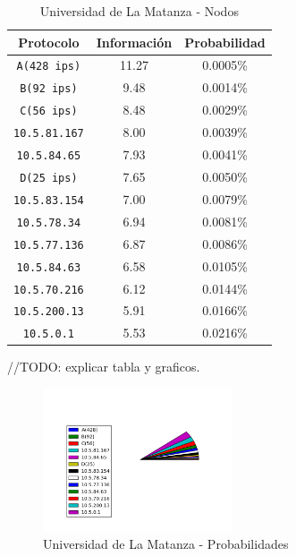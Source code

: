 \documentclass[final,inline,narroweqnarray,a4paper]{ieee}
\begin{document}
\begin{table}[H]
    \begin{center}
        \begin{tabular}{|c|c|c|}
            \hline
            \textbf{Protocolo} & \textbf{Información} & \textbf{Probabilidad} \\ \hline
            \texttt{A(428 ips)}   &11.27       & 0.0005\%     \\ \hline
            \texttt{B(92 ips)}    &9.48        & 0.0014\%     \\ \hline
            \texttt{C(56 ips)}    &8.48        & 0.0029\%     \\ \hline
	    \texttt{10.5.81.167}  &8.00        & 0.0039\%     \\ \hline
	    \texttt{10.5.84.65}   &7.93        & 0.0041\%     \\ \hline
            \texttt{D(25 ips)}    &7.65        & 0.0050\%     \\ \hline
	    \texttt{10.5.83.154}  &7.00        & 0.0079\%     \\ \hline
	    \texttt{10.5.78.34}   &6.94        & 0.0081\%     \\ \hline
	    \texttt{10.5.77.136}  &6.87        & 0.0086\%     \\ \hline
	    \texttt{10.5.84.63}   &6.58        & 0.0105\%     \\ \hline
	    \texttt{10.5.70.216}  &6.12        & 0.0144\%     \\ \hline
	    \texttt{10.5.200.13}  &5.91        & 0.0166\%     \\ \hline
	    \texttt{10.5.0.1}     &5.53        & 0.0216\%     \\ \hline
        \end{tabular}
        \caption{Universidad de La Matanza - Nodos}
        \label{table:universidadLMS1}
    \end{center}
\end{table}

//TODO: explicar tabla y graficos.

\begin{figure}[H]
    \begin{center}
        \includegraphics[width=0.5\textwidth]{plot/facultadS1_v3-pie.png}
        \caption{Universidad de La Matanza - Probabilidades}
        \label{torta:universidadLMS1}
    \end{center}
\end{figure} 
\end{document}
